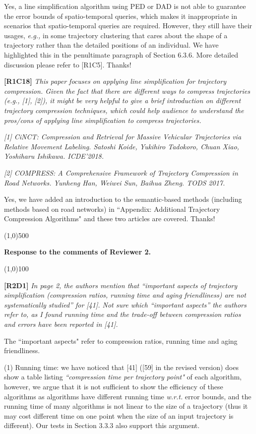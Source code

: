 \documentclass{letter}
\newcommand{\eg}{\emph{e.g.,}\xspace}
\newcommand{\wrt}{\emph{w.r.t.}\xspace}
\begin{document}
{Yes, a line simplification algorithm using PED or DAD is not able to guarantee the error bounds of spatio-temporal queries, which makes it inappropriate in scenarios that spatio-temporal queries are required. However, they still have their usages, \eg in some trajectory clustering that cares about the shape of a trajectory rather than the detailed positions of an individual. We have highlighted this in the penultimate paragraph of Section 6.3.6. More detailed discussion please refer to [R1C5]. 
Thanks!

\textbf{[R1C18]} \emph{ This paper focuses on applying line simplification for trajectory compression. Given the fact that there are different ways to compress trajectories (e.g., [1], [2]), it might be very helpful to give a brief introduction on different trajectory compression techniques, which could help audience to understand the pros/cons of applying line simplification to compress trajectories. }

\emph{ [1] CiNCT: Compression and Retrieval for Massive Vehicular Trajectories via Relative Movement Labeling. Satoshi Koide, Yukihiro Tadokoro, Chuan Xiao, Yoshiharu Ishikawa. ICDE'2018.}

\emph{ [2] COMPRESS: A Comprehensive Framework of Trajectory Compression in Road Networks. Yunheng Han, Weiwei Sun, Baihua Zheng. TODS 2017.}


{Yes, we have added an introduction to the semantic-based methods (including methods based on road networks) in ``Appendix: Additional Trajectory Compression Algorithms" and these two articles are covered. Thanks!} 

\line(1,0){500}

\textbf{Response to the comments of Reviewer 2.}

\line(1,0){100}

\textbf{[R2D1]} \emph{In page 2, the authors mention that “important aspects of trajectory simplification (compression ratios, running time and aging friendliness) are not systematically studied” for [41]. Not sure which “important aspects” the authors refer to, as I found running time and the trade-off between compression ratios and errors have been reported in [41].}

The ``important aspects" refer to compression ratios, running time and aging friendliness.

(1) Running time: we have noticed that [41] ([59] in the revised version) does show a table listing \emph{``compression time per trajectory point"} of each algorithm, however, we argue that it is not sufficient to show the efficiency of these algorithms as algorithms have different running time \wrt error bounds, and the running time of many algorithms is not linear to the size of a trajectory (thus it may cost different time on one point when the size of an input trajectory is different). Our tests in Section 3.3.3 also support this argument.
 
}
\end{document}
